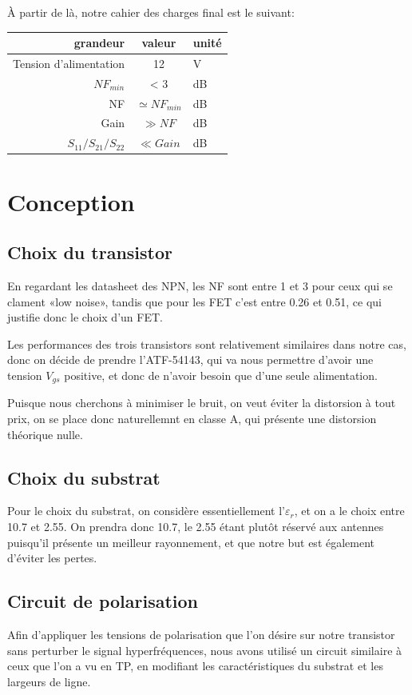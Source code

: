 \documentclass[12pt]{article}
\begin{document}
À partir de là, notre cahier des charges final est le suivant:

\begin{center}
\begin{tabular}{|r|c|l|}
\hline 
grandeur & valeur & unité\\ 
\hline 
Tension d’alimentation & 12 & V \\ 
\hline
$NF_{min}$ & < 3 & dB\\ 
\hline 
NF & $\simeq NF_{min}$ & dB\\ 
\hline 
Gain & $\gg NF$ & dB \\ 
\hline 
$S_{11}/S_{21}/S_{22}$ & $\ll Gain$ & dB \\
\hline
\end{tabular} 
\end{center}

\section{Conception}

\subsection{Choix du transistor}
En regardant les datasheet des NPN, les NF sont entre 1 et 3 pour ceux qui se clament «low noise», tandis que pour les FET c’est entre 0.26 et 0.51, ce qui justifie donc le choix d’un FET.

Les performances des trois transistors sont relativement similaires dans notre cas, donc on décide de prendre l’ATF-54143, qui va nous permettre d’avoir une tension $V_{gs}$ positive, et donc de n’avoir besoin que d’une seule alimentation.

Puisque nous cherchons à minimiser le bruit, on veut éviter la distorsion à tout prix, on se place donc naturellemnt en classe A, qui présente une distorsion théorique nulle.

\subsection{Choix du substrat}

Pour le choix du substrat, on considère essentiellement l’$\varepsilon_r$, et on a le choix entre 10.7 et 2.55. On prendra donc 10.7, le 2.55 étant plutôt réservé aux antennes puisqu’il présente un meilleur rayonnement, et que notre but est également d’éviter les pertes.


\subsection{Circuit de polarisation}
Afin d’appliquer les tensions de polarisation que l’on désire sur notre transistor sans perturber le signal hyperfréquences, nous avons utilisé un circuit similaire à ceux que l’on a vu en TP, en modifiant les caractéristiques du substrat et les largeurs de ligne. 
\end{document}
